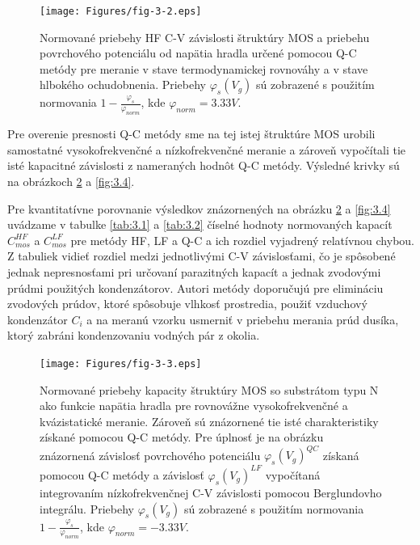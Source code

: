 \begin{figure}[h!]\centering
\texttt{[image: Figures/fig-3-2.eps]}
\captionsetup{justification=raggedright, singlelinecheck=false}
\caption[Normované priebehy HF C-V závislosti štruktúry MOS a priebehu
  povrchového potenciálu od napätia hradla určené pomocou Q-C metódy
  pre meranie v stave termodynamickej rovnováhy a v stave hlbokého
  ochudobnenia]{Normované priebehy HF C-V závislosti štruktúry
  MOS a priebehu povrchového potenciálu od napätia hradla určené
  pomocou Q-C metódy pre meranie v stave termodynamickej rovnováhy a v
  stave hlbokého ochudobnenia. Priebehy $\varphi_s(V_g)$ sú zobrazené
  s použitím normovania $1 - \frac{\varphi_s}{\varphi_{norm}}$, kde
  $\varphi_{norm}=3.33V$.}
\label{fig:3.2}
\end{figure}

Pre overenie presnosti Q-C metódy sme na tej istej štruktúre MOS
urobili samostatné vysokofrekvenčné a nízkofrekvenčné meranie a
zároveň vypočítali tie isté kapacitné závislosti z nameraných hodnôt
Q-C metódy.  Výsledné krivky sú na obrázkoch \ref{fig:3.3} a
\ref{fig:3.4}.

Pre kvantitatívne porovnanie výsledkov znázornených na obrázku
\ref{fig:3.3} a \ref{fig:3.4} uvádzame v tabulke \ref{tab:3.1} a
\ref{tab:3.2} číselné hodnoty normovaných kapacít $C^{HF}_{mos}$ a
$C^{LF}_{mos}$ pre metódy HF, LF a Q-C a ich rozdiel vyjadrený
relatívnou chybou. Z tabuliek vidieť rozdiel medzi jednotlivými C-V
závislosťami, čo je spôsobené jednak nepresnosťami pri určovaní
parazitných kapacít a jednak zvodovými prúdmi použitých
kondenzátorov. Autori metódy doporučujú pre elimináciu zvodových
prúdov, ktoré spôsobuje vlhkosť prostredia, použiť vzduchový
kondenzátor $C_i$ a na meranú vzorku usmerniť v priebehu merania prúd
dusíka, ktorý zabráni kondenzovaniu vodných pár z okolia.

\begin{figure}[h!]\centering
\texttt{[image: Figures/fig-3-3.eps]}
\captionsetup{justification=raggedright, singlelinecheck=false}
\caption[Normované priebehy kapacity štruktúry MOS so substrátom typu
  N ako funkcie napätia hradla pre rovnovážne vysokofrekvenčné a
  kvázistatické meranie]{Normované priebehy kapacity štruktúry MOS so
  substrátom typu N ako funkcie napätia hradla pre rovnovážne
  vysokofrekvenčné a kvázistatické meranie.  Zároveň sú znázornené tie
  isté charakteristiky získané pomocou Q-C metódy. Pre úplnosť je na
  obrázku znázornená závislosť povrchového potenciálu
  $\varphi_s(V_g)^{QC}$ získaná pomocou Q-C metódy a závislosť
  $\varphi_s(V_g)^{LF}$ vypočítaná integrovaním nízkofrekvenčnej C-V
  závislosti pomocou Berglundovho integrálu.  Priebehy
  $\varphi_s(V_g)$ sú zobrazené s použitím normovania $1 -
  \frac{\varphi_s}{\varphi_{norm}}$, kde $\varphi_{norm}=-3.33V$.}
\label{fig:3.3}
\end{figure}

